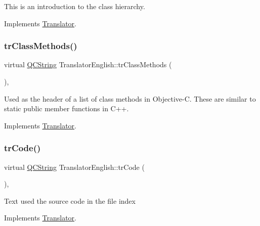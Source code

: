 This is an introduction to the class hierarchy. 

Implements \mbox{\hyperlink{class_translator}{Translator}}.

\mbox{\label{class_translator_english_a7148dfb24ec3834caa3a2c42e6fd97d9}} 
\subsubsection{\texorpdfstring{trClassMethods()}{trClassMethods()}}
{\footnotesize\ttfamily virtual \mbox{\hyperlink{class_q_c_string}{Q\+C\+String}} Translator\+English\+::tr\+Class\+Methods (\begin{DoxyParamCaption}{ }\end{DoxyParamCaption})\hspace{0.3cm}{\ttfamily [inline]}, {\ttfamily [virtual]}}

Used as the header of a list of class methods in Objective-\/C. These are similar to static public member functions in C++. 

Implements \mbox{\hyperlink{class_translator}{Translator}}.

\mbox{\label{class_translator_english_aaaa6fa1f6a2d547f5f24d147e70ded60}} 
\subsubsection{\texorpdfstring{trCode()}{trCode()}}
{\footnotesize\ttfamily virtual \mbox{\hyperlink{class_q_c_string}{Q\+C\+String}} Translator\+English\+::tr\+Code (\begin{DoxyParamCaption}{ }\end{DoxyParamCaption})\hspace{0.3cm}{\ttfamily [inline]}, {\ttfamily [virtual]}}

Text used the source code in the file index 

Implements \mbox{\hyperlink{class_translator}{Translator}}.

\mbox{\label{class_translator_english_a7dbccfa9762f584af7d0ad152f719053}} 

